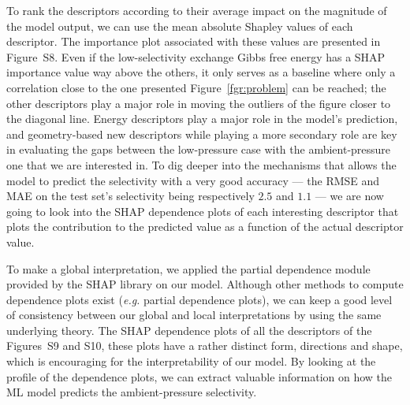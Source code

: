 \documentclass[main]{subfiles}
\begin{document}
To rank the descriptors according to their average impact on the magnitude of the model output, we can use the mean absolute Shapley values of each descriptor. The importance plot associated with these values are presented in Figure~S8. Even if the low-selectivity exchange Gibbs free energy has a SHAP importance value way above the others, it only serves as a baseline where only a correlation close to the one presented Figure~\ref{fgr:problem} can be reached; the other descriptors play a major role in moving the outliers of the figure closer to the diagonal line. Energy descriptors play a major role in the model's prediction, and geometry-based new descriptors while playing a more secondary role are key in evaluating the gaps between the low-pressure case with the ambient-pressure one that we are interested in. To dig deeper into the mechanisms that allows the model to predict the selectivity with a very good accuracy --- the RMSE and MAE on the test set's selectivity being respectively $2.5$ and $1.1$ --- we are now going to look into the SHAP dependence plots of each interesting descriptor that plots the contribution to the predicted value as a function of the actual descriptor value.

To make a global interpretation, we applied the partial dependence module provided by the SHAP library on our model. Although other methods to compute dependence plots exist (\emph{e.g.} partial dependence plots),\cite{molnar2020interpretable} we can keep a good level of consistency between our global and local interpretations by using the same underlying theory. The SHAP dependence plots of all the descriptors of the Figures~S9 and S10, these plots have a rather distinct form, directions and shape, which is encouraging for the interpretability of our model. By looking at the profile of the dependence plots, we can extract valuable information on how the ML model predicts the ambient-pressure selectivity.
\end{document}
